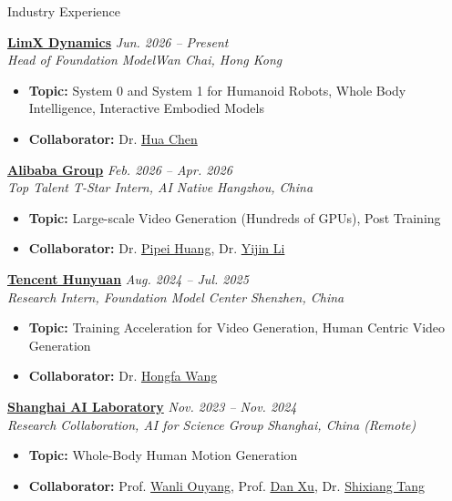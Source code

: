 \documentclass[a4paper]{resume} %
\begin{document}



\begin{rSection}{Industry Experience}

{\bf \href{https://www.limxdynamics.com/en}{LimX Dynamics}} \hfill{\it Jun. 2026 -- Present}\\
{\it Head of Foundation Model}\hfill{\it Wan Chai, Hong Kong}
\begin{itemize}
    \item {\bf Topic:}  System 0 and System 1 for Humanoid Robots, Whole Body Intelligence, Interactive Embodied Models
 	\item {\bf Collaborator:} Dr. \href{https://scholar.google.com/citations?user=sFTLO0EAAAAJ}{Hua Chen}
\end{itemize}


{\bf \href{https://www.alibaba.com}{Alibaba Group}} \hfill{\it Feb. 2026 -- Apr. 2026}\\
{\it Top Talent T-Star Intern, AI Native} \hfill{\it Hangzhou, China}
\begin{itemize}
    \item {\bf Topic:} Large-scale Video Generation (Hundreds of GPUs), Post Training
 	\item {\bf Collaborator:} Dr. \href{https://scholar.google.com/citations?user=RPqpC-cAAAAJ}{Pipei Huang}, Dr. \href{https://scholar.google.com/citations?user=KCooJasAAAAJ}{Yijin Li}
\end{itemize}


{\bf \href{https://www.tencent.com/en-us/}{Tencent Hunyuan}} \hfill{\it Aug. 2024 -- Jul. 2025}\\
{\it Research Intern, Foundation Model Center} \hfill{\it Shenzhen, China}
\begin{itemize}
    \item {\bf Topic:} Training Acceleration for Video Generation, Human Centric Video Generation
 	\item {\bf Collaborator:} Dr. \href{https://scholar.google.com/citations?user=q9Fn50QAAAAJ\&hl=en\&oi=ao}{Hongfa Wang}
\end{itemize}


{\bf \href{https://www.shlab.org.cn}{Shanghai AI Laboratory}} \hfill{\it Nov. 2023 -- Nov. 2024}\\
{\it Research Collaboration, AI for Science Group} \hfill{\it Shanghai, China (Remote)}
\begin{itemize}
    \item {\bf Topic:} Whole-Body Human Motion Generation
 	\item {\bf Collaborator:} Prof. \href{https://wlouyang.github.io/}{Wanli Ouyang}, Prof. \href{https://www.danxurgb.net/}{Dan Xu}, Dr. \href{https://scholar.google.com.tw/citations?user=TJ4ihdkAAAAJ}{Shixiang Tang}
\end{itemize}



\end{rSection}
\end{document}
